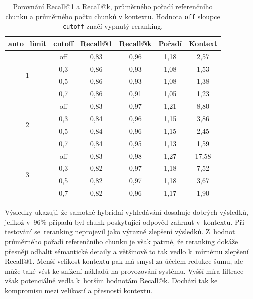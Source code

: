 \begin{table}[H]
    \centering
    \label{tab:retrieval_metrics_full}
    \renewcommand{\arraystretch}{1.2}
    \begin{tabular}{|c|c|c|c|c|c|}
        \hline
        \textbf{auto\_limit} & \textbf{cutoff} & \textbf{Recall@1} & \textbf{Recall@k} & \textbf{Pořadí} & \textbf{Kontext} \\
        \hline
        \multirow{4}{*}{1} 
        & off   & 0{,}83 & 0{,}96 & 1{,}18 & 2{,}57 \\
        & 0{,}3   & 0{,}86 & 0{,}93 & 1{,}08 & 1{,}53 \\
        & 0{,}5   & 0{,}86 & 0{,}93 & 1{,}08 & 1{,}38 \\
        & 0{,}7   & 0{,}86 & 0{,}91 & 1{,}05 & 1{,}23 \\
        \hline
        \multirow{4}{*}{2} 
        & off   & 0{,}83 & 0{,}97 & 1{,}21 & 8{,}80 \\
        & 0{,}3   & 0{,}84 & 0{,}96 & 1{,}15 & 3{,}86 \\
        & 0{,}5   & 0{,}84 & 0{,}96 & 1{,}15 & 2{,}45 \\
        & 0{,}7   & 0{,}84 & 0{,}95 & 1{,}13 & 1{,}59 \\
        \hline
        \multirow{4}{*}{3} 
        & off   & 0{,}83 & 0{,}98 & 1{,}27 & 17{,}58 \\
        & 0{,}3   & 0{,}82 & 0{,}97 & 1{,}18 & 7{,}52 \\
        & 0{,}5   & 0{,}82 & 0{,}97 & 1{,}18 & 3{,}67 \\
        & 0{,}7   & 0{,}82 & 0{,}96 & 1{,}17 & 1{,}90 \\
        \hline
    \end{tabular}
    \caption{Porovnání Recall@1 a Recall@k, průměrného pořadí referenčního chunku a průměrného počtu chunků v kontextu. Hodnota \texttt{off} sloupce \texttt{cutoff} značí vypnutý reranking.}
\end{table}

Výsledky ukazují, že samotné hybridní vyhledávání dosahuje dobrých výsledků, jelikož v~96\% případů byl chunk poskytující odpověď zahrnut v~kontextu. Při testování se~reranking neprojevil jako výrazné zlepšení výsledků. Z~hodnot průměrného pořadí referenčního chunku je však patrné, že reranking dokáže přesněji odhalit sémantické detaily a většinově to tak vedlo k~mírnému zlepšení Recall@1. Menší velikost kontextu pak má smysl za účelem redukce šumu, ale může také vést ke snížení nákladů na provozování systému. Vyšší míra filtrace však potenciálně vedla k~horším hodnotám Recall@k. Dochází tak ke kompromisu mezi velikostí a přesností kontextu.   

